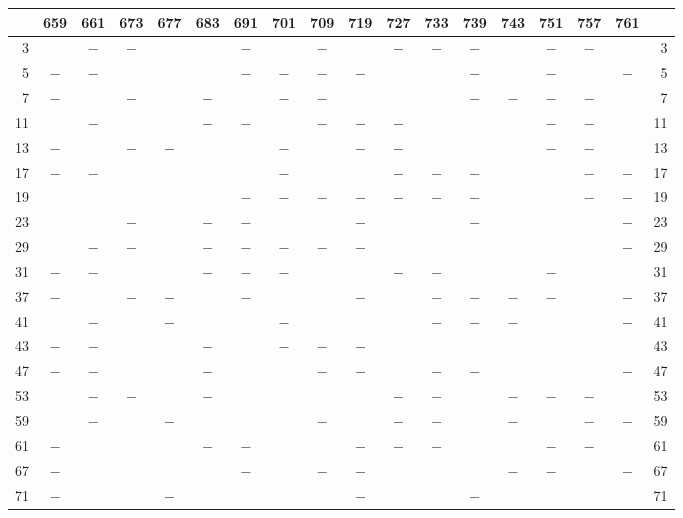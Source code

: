 \begin{center}\begingroup\fontsize{8}{10.5}\selectfont\setlength{\tabcolsep}{2pt}
\begin{tabular}{r|c|c|c|c|c|c|c|c|c|c|c|c|c|c|c|c|r}
\hline
 & 659 & 661 & 673 & 677 & 683 & 691 & 701 & 709 & 719 & 727 & 733 & 739 & 743 & 751 & 757 & 761 & \\
\hline
3 &  & $-$ & $-$ &  &  & $-$ &  & $-$ &  & $-$ & $-$ & $-$ &  & $-$ & $-$ &  & 3\\
5 & $-$ & $-$ &  &  &  & $-$ & $-$ & $-$ & $-$ &  &  & $-$ &  & $-$ &  & $-$ & 5\\
7 & $-$ &  & $-$ &  & $-$ &  & $-$ & $-$ &  &  &  & $-$ & $-$ & $-$ & $-$ &  & 7\\
11 &  & $-$ &  &  & $-$ & $-$ &  & $-$ & $-$ & $-$ &  &  &  & $-$ & $-$ &  & 11\\
13 & $-$ &  & $-$ & $-$ &  &  & $-$ &  & $-$ & $-$ &  &  &  & $-$ & $-$ &  & 13\\
17 & $-$ & $-$ &  &  &  &  & $-$ &  &  & $-$ & $-$ & $-$ &  &  & $-$ & $-$ & 17\\
19 &  &  &  &  &  & $-$ & $-$ & $-$ & $-$ & $-$ & $-$ & $-$ &  &  & $-$ & $-$ & 19\\
23 &  &  & $-$ &  & $-$ & $-$ &  &  & $-$ &  &  & $-$ &  &  &  & $-$ & 23\\
29 &  & $-$ & $-$ &  & $-$ & $-$ & $-$ & $-$ & $-$ &  &  &  &  &  &  & $-$ & 29\\
31 & $-$ & $-$ &  &  & $-$ & $-$ & $-$ &  &  & $-$ & $-$ &  &  & $-$ &  &  & 31\\
37 & $-$ &  & $-$ & $-$ &  & $-$ &  &  & $-$ &  & $-$ & $-$ & $-$ & $-$ &  & $-$ & 37\\
41 &  & $-$ &  & $-$ &  &  & $-$ &  &  &  & $-$ & $-$ & $-$ &  &  & $-$ & 41\\
43 & $-$ & $-$ &  &  & $-$ &  & $-$ & $-$ & $-$ &  &  &  &  &  &  &  & 43\\
47 & $-$ & $-$ &  &  & $-$ &  &  & $-$ & $-$ &  & $-$ & $-$ &  &  &  & $-$ & 47\\
53 &  & $-$ & $-$ &  & $-$ &  &  &  &  & $-$ & $-$ &  & $-$ & $-$ & $-$ &  & 53\\
59 &  & $-$ &  & $-$ &  &  &  & $-$ &  & $-$ & $-$ &  & $-$ &  & $-$ & $-$ & 59\\
61 & $-$ &  &  &  & $-$ & $-$ &  &  & $-$ & $-$ & $-$ &  &  & $-$ & $-$ &  & 61\\
67 & $-$ &  &  &  &  & $-$ &  & $-$ & $-$ &  &  &  & $-$ & $-$ &  & $-$ & 67\\
71 & $-$ &  &  & $-$ &  &  &  &  & $-$ &  &  & $-$ &  &  &  &  & 71\\

\end{tabular}
\end{center}

